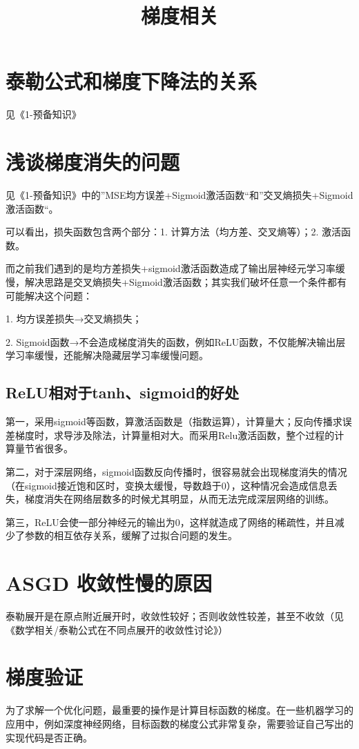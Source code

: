 \documentclass[12pt]{article}
\title{梯度相关}
\begin{document}
\maketitle

\section{泰勒公式和梯度下降法的关系}
见《1-预备知识》

\section{浅谈梯度消失的问题\cite{Commonly_Loss_Functions}}
见《1-预备知识》中的”MSE均方误差+Sigmoid激活函数“和”交叉熵损失+Sigmoid激活函数“。

可以看出，损失函数包含两个部分：1. 计算方法（均方差、交叉熵等）；2. 激活函数。

而之前我们遇到的是均方差损失+sigmoid激活函数造成了输出层神经元学习率缓慢，解决思路是交叉熵损失+Sigmoid激活函数；其实我们破坏任意一个条件都有可能解决这个问题：

1. 均方误差损失→交叉熵损失；

2. Sigmoid函数→不会造成梯度消失的函数，例如ReLU函数，不仅能解决输出层学习率缓慢，还能解决隐藏层学习率缓慢问题。

\subsection{ReLU相对于tanh、sigmoid的好处}
第一，采用sigmoid等函数，算激活函数是（指数运算），计算量大；反向传播求误差梯度时，求导涉及除法，计算量相对大。而采用Relu激活函数，整个过程的计算量节省很多。

第二，对于深层网络，sigmoid函数反向传播时，很容易就会出现梯度消失的情况（在sigmoid接近饱和区时，变换太缓慢，导数趋于0），这种情况会造成信息丢失，梯度消失在网络层数多的时候尤其明显，从而无法完成深层网络的训练。

第三，ReLU会使一部分神经元的输出为0，这样就造成了网络的稀疏性，并且减少了参数的相互依存关系，缓解了过拟合问题的发生。

\section{ASGD 收敛性慢的原因}
泰勒展开是在原点附近展开时，收敛性较好；否则收敛性较差，甚至不收敛（见《数学相关/泰勒公式在不同点展开的收敛性讨论》）

\section{梯度验证\cite{Verify_Gradient}}
为了求解一个优化问题，最重要的操作是计算目标函数的梯度。在一些机器学习的应用中，例如深度神经网络，目标函数的梯度公式非常复杂，需要验证自己写出的实现代码是否正确。
\end{document}
